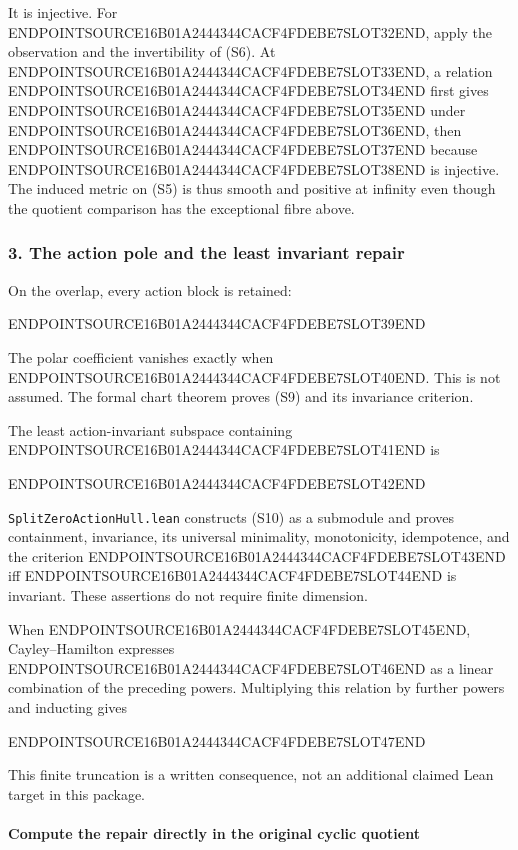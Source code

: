 It is injective. For ENDPOINTSOURCE16B01A2444344CACF4FDEBE7SLOT32END, apply the observation and the invertibility of (S6). At ENDPOINTSOURCE16B01A2444344CACF4FDEBE7SLOT33END, a relation ENDPOINTSOURCE16B01A2444344CACF4FDEBE7SLOT34END first gives ENDPOINTSOURCE16B01A2444344CACF4FDEBE7SLOT35END under ENDPOINTSOURCE16B01A2444344CACF4FDEBE7SLOT36END, then ENDPOINTSOURCE16B01A2444344CACF4FDEBE7SLOT37END because ENDPOINTSOURCE16B01A2444344CACF4FDEBE7SLOT38END is injective. The induced metric on (S5) is thus smooth and positive at infinity even though the quotient comparison has the exceptional fibre above.

\subsubsection{3. The action pole and the least invariant repair}\label{endpoint-cc_specialization--the-action-pole-and-the-least-invariant-repair}

On the overlap, every action block is retained:

ENDPOINTSOURCE16B01A2444344CACF4FDEBE7SLOT39END

The polar coefficient vanishes exactly when ENDPOINTSOURCE16B01A2444344CACF4FDEBE7SLOT40END. This is not assumed. The formal chart theorem proves (S9) and its invariance criterion.

The least action-invariant subspace containing ENDPOINTSOURCE16B01A2444344CACF4FDEBE7SLOT41END is

ENDPOINTSOURCE16B01A2444344CACF4FDEBE7SLOT42END

\texttt{SplitZeroActionHull.lean} constructs (S10) as a submodule and proves containment, invariance, its universal minimality, monotonicity, idempotence, and the criterion ENDPOINTSOURCE16B01A2444344CACF4FDEBE7SLOT43END iff ENDPOINTSOURCE16B01A2444344CACF4FDEBE7SLOT44END is invariant. These assertions do not require finite dimension.

When ENDPOINTSOURCE16B01A2444344CACF4FDEBE7SLOT45END, Cayley--Hamilton expresses ENDPOINTSOURCE16B01A2444344CACF4FDEBE7SLOT46END as a linear combination of the preceding powers. Multiplying this relation by further powers and inducting gives

ENDPOINTSOURCE16B01A2444344CACF4FDEBE7SLOT47END

This finite truncation is a written consequence, not an additional claimed Lean target in this package.

\paragraph{Compute the repair directly in the original cyclic quotient}\label{endpoint-cc_specialization--compute-the-repair-directly-in-the-original-cyclic-quotient}

